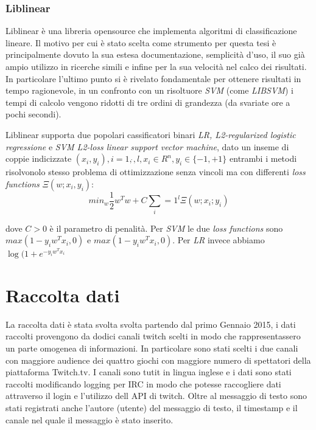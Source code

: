 \documentclass[a4paper,12pt,openright,twoside]{report}
\theoremstyle{definition}
\begin{document}
\subsection{Liblinear}
Liblinear è una libreria opensource che implementa algoritmi di classificazione lineare. Il motivo
per cui è stato scelta come strumento per questa
tesi è principalmente dovuto la sua estesa documentazione, semplicità
d'uso, il suo già ampio utilizzo in ricerche simili e infine per la sua velocità nel calco dei risultati. In particolare l'ultimo punto si è rivelato fondamentale
per ottenere risultati in tempo ragionevole, in un confronto con un risoltuore \emph{SVM} (come \emph{LIBSVM})
i tempi di calcolo vengono ridotti di tre ordini di grandezza (da svariate ore a pochi secondi).

Liblinear supporta due popolari cassificatori binari \emph{LR, L2-regularized logistic regressione} e 
\emph{SVM L2-loss linear support vector machine}, dato un inseme di coppie
indicizzate $(x_i,y_i),i=1,\dot{},l,x_i\in R^n, y_i \in \{-1,+1\}$ entrambi i metodi risolvonolo stesso
problema di ottimizzazione senza vincoli ma con differenti \emph{loss functions} $\Xi(w;x_i,y_i)$:
\begin{equation}
	min_w \frac{1}{2}w^Tw+C\sum_i=1^l\Xi(w;x_i;y_i)
	\label{eqn:liblinear1}
\end{equation}

dove $C > 0$ è il parametro di penalità. Per \emph{SVM} le due \emph{loss functions} sono $max(1-y_iw^Tx_i,0)$ e
$max(1-y_iw^Tx_i,0)$. Per \emph{LR} invece abbiamo $\log(1+e^{-y_iw^Tx_i}$


\chapter{Raccolta dati}
La raccolta dati è stata svolta svolta partendo dal primo Gennaio 2015, i dati raccolti provengono da dodici canali twitch scelti in modo che rappresentassero un parte omogenea di informazioni.
In particolare sono stati scelti i due canali con maggiore audience dei quattro giochi con maggiore numero di spettatori della piattaforma Twitch.tv.
I canali sono tutit in lingua inglese e i dati sono stati raccolti modificando logging per IRC  in modo che potesse raccogliere dati attraverso il login e l'utilizzo dell API di twitch.
Oltre al messaggio di testo sono stati registrati anche l'autore (utente) del messaggio di testo, il timestamp e il canale nel quale il messaggio è stato inserito.
\end{document}
